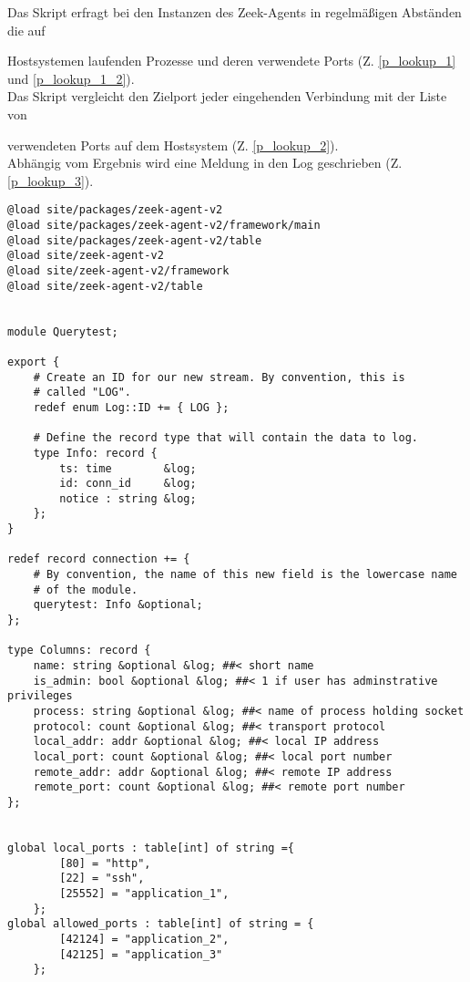 Das Skript erfragt bei den Instanzen des Zeek-Agents in regelmäßigen Abständen die auf

Hostsystemen laufenden Prozesse und deren verwendete Ports (Z. \ref{p_lookup_1} und \ref{p_lookup_1_2}).\\

Das Skript vergleicht den Zielport jeder eingehenden Verbindung mit der Liste von 

verwendeten Ports auf dem Hostsystem (Z. \ref{p_lookup_2}).\\

Abhängig vom Ergebnis wird eine Meldung in den Log geschrieben (Z. \ref{p_lookup_3}).
\begin{lstlisting}[caption={Abfrage und Abgleich der Ports },label={Code_4},consecutivenumbers=false,lastline=77,firstnumber=52,numberblanklines=false,linerange={52-55,62-70,76-77}]
@load site/packages/zeek-agent-v2
@load site/packages/zeek-agent-v2/framework/main
@load site/packages/zeek-agent-v2/table
@load site/zeek-agent-v2
@load site/zeek-agent-v2/framework
@load site/zeek-agent-v2/table


module Querytest;

export {
    # Create an ID for our new stream. By convention, this is
    # called "LOG".
    redef enum Log::ID += { LOG };

    # Define the record type that will contain the data to log.
    type Info: record {
        ts: time        &log;
        id: conn_id     &log; 
        notice : string &log;
    };
}

redef record connection += {
    # By convention, the name of this new field is the lowercase name
    # of the module.
    querytest: Info &optional;
};

type Columns: record {
    name: string &optional &log; ##< short name
    is_admin: bool &optional &log; ##< 1 if user has adminstrative privileges
    process: string &optional &log; ##< name of process holding socket
    protocol: count &optional &log; ##< transport protocol
    local_addr: addr &optional &log; ##< local IP address
    local_port: count &optional &log; ##< local port number
    remote_addr: addr &optional &log; ##< remote IP address
    remote_port: count &optional &log; ##< remote port number
};


global local_ports : table[int] of string ={
        [80] = "http",
        [22] = "ssh",
        [25552] = "application_1",
    };
global allowed_ports : table[int] of string = {
        [42124] = "application_2",
        [42125] = "application_3" 
    };


\end{lstlisting}
